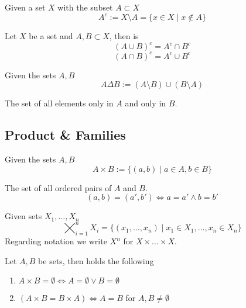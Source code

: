 \begin{definition}
   Given a set \(X\) with the subset \(A \subset X\)
   \[A^c := X \setminus A = \{x \in X \mid x \not\in A\}\]
\end{definition}

\begin{proposition}
   Let \(X\) be a set and \(A, B \subset X\), then is
   \[(A \cup B)^c = A^c \cap B^c\]
   \[(A \cap B)^c = A^c \cup B^c\]
\end{proposition}

\begin{definition}
   Given the sets \(A, B\)
   \[A \Delta B := (A \setminus B) \cup (B \setminus A)\]
\end{definition}
\begin{remark}
   The set of all elements only in \(A\) and only in \(B\).
\end{remark}

\subsection{Product \& Families}
\begin{definition}
   Given the sets \(A, B\)
   \[A \times B := \{(a, b) \mid a \in A, b \in B\}\]
\end{definition}
\begin{remark}
   The set of all ordered pairs of \(A\) and \(B\).
   \[(a, b) = (a', b') \iff a = a' \land b = b'\]
\end{remark}
\begin{remark}
   Given sets \(X_1, \ldots, X_n\)
   \[\bigtimes_{i=1}^n X_i = \{(x_1, \ldots, x_n) \mid x_1 \in X_1, \ldots, x_n \in X_n\}\]
   Regarding notation we write \(X^n\) for \(X \times \ldots \times X\).
\end{remark}

\begin{proposition}
   Let \(A, B\) be sets, then holds the following
   \begin{enumerate}[label=\roman*, align=Center]
      \item \(A \times B = \emptyset \iff A = \emptyset \lor B = \emptyset\)
      \item \((A \times B = B \times A) \iff A = B\) for \(A, B \neq \emptyset\)
   \end{enumerate}
\end{proposition}

